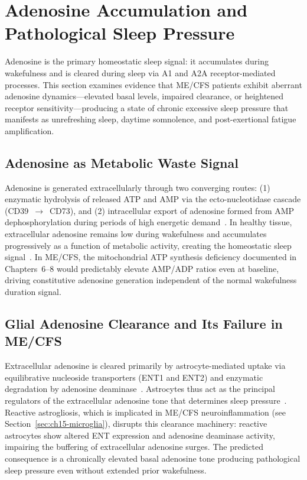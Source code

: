 \section{Adenosine Accumulation and Pathological Sleep Pressure}
\label{sec:ch15-adenosine}

Adenosine is the primary homeostatic sleep signal: it accumulates during wakefulness and is cleared during sleep via A1 and A2A receptor-mediated processes. This section examines evidence that ME/CFS patients exhibit aberrant adenosine dynamics---elevated basal levels, impaired clearance, or heightened receptor sensitivity---producing a state of chronic excessive sleep pressure that manifests as unrefreshing sleep, daytime somnolence, and post-exertional fatigue amplification.

\subsection{Adenosine as Metabolic Waste Signal}

Adenosine is generated extracellularly through two converging routes: (1) enzymatic hydrolysis of released ATP and AMP via the ecto-nucleotidase cascade (CD39~$\to$~CD73), and (2) intracellular export of adenosine formed from AMP dephosphorylation during periods of high energetic demand~\cite{Chang2021AdenosineHomeostasis}. In healthy tissue, extracellular adenosine remains low during wakefulness and accumulates progressively as a function of metabolic activity, creating the homeostatic sleep signal~\cite{Huang2024Adenosine}. In ME/CFS, the mitochondrial ATP synthesis deficiency documented in Chapters~6--8 would predictably elevate AMP/ADP ratios even at baseline, driving constitutive adenosine generation independent of the normal wakefulness duration signal.

\subsection{Glial Adenosine Clearance and Its Failure in ME/CFS}

Extracellular adenosine is cleared primarily by astrocyte-mediated uptake via equilibrative nucleoside transporters (ENT1 and ENT2) and enzymatic degradation by adenosine deaminase~\cite{Chang2021AdenosineHomeostasis}. Astrocytes thus act as the principal regulators of the extracellular adenosine tone that determines sleep pressure~\cite{RabagoMonzon2025SleepGlia}. Reactive astrogliosis, which is implicated in ME/CFS neuroinflammation (see Section~\ref{sec:ch15-microglia}), disrupts this clearance machinery: reactive astrocytes show altered ENT expression and adenosine deaminase activity, impairing the buffering of extracellular adenosine surges. The predicted consequence is a chronically elevated basal adenosine tone producing pathological sleep pressure even without extended prior wakefulness.

